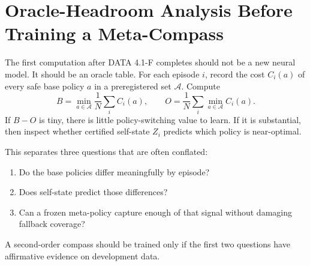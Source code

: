\documentclass[11pt]{article}
\begin{document}
\section{Oracle-Headroom Analysis Before Training a Meta-Compass}
The first computation after DATA 4.1-F completes should not be a new neural model. It should be an oracle table. For each episode $i$, record the cost $C_i(a)$ of every safe base policy $a$ in a preregistered set $\mathcal A$. Compute
\[
B=\min_{a\in\mathcal A}\frac1N\sum_i C_i(a),
\qquad
O=\frac1N\sum_i\min_{a\in\mathcal A}C_i(a).
\]
If $B-O$ is tiny, there is little policy-switching value to learn. If it is substantial, then inspect whether certified self-state $Z_i$ predicts which policy is near-optimal.

This separates three questions that are often conflated:
\begin{enumerate}
\item Do the base policies differ meaningfully by episode?
\item Does self-state predict those differences?
\item Can a frozen meta-policy capture enough of that signal without damaging fallback coverage?
\end{enumerate}

A second-order compass should be trained only if the first two questions have affirmative evidence on development data.
\end{document}
